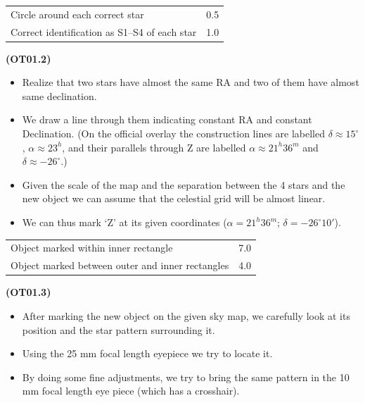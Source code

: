 \begin{center}
\begin{tabular}{l r}
\hline
Circle around each correct star & 0.5 \\
Correct identification as S1--S4 of each star & 1.0 \\
\hline
\end{tabular}
\end{center}

\textbf{(OT01.2)}
\begin{itemize}
\item Realize that two stars have almost the same RA and two of them have
  almost same declination.
\item We draw a line through them indicating constant RA and constant
  Declination. (On the official overlay the construction lines are labelled
  $\delta \approx 15^\circ$, $\alpha \approx 23^h$, and their parallels
  through Z are labelled $\alpha \approx 21^h36^m$ and
  $\delta \approx -26^\circ$.)
\item Given the scale of the map and the separation between the 4 stars and
  the new object we can assume that the celestial grid will be almost
  linear.
\item We can thus mark `Z' at its given coordinates
  ($\alpha = 21^h36^m$; $\delta = -26^\circ10'$).
\end{itemize}

\begin{center}
\begin{tabular}{l r}
\hline
Object marked within inner rectangle & 7.0 \\
\quad Object marked between outer and inner rectangles & 4.0 \\
\hline
\end{tabular}
\end{center}

\textbf{(OT01.3)}
\begin{itemize}
\item After marking the new object on the given sky map, we carefully look
  at its position and the star pattern surrounding it.
\item Using the 25 mm focal length eyepiece we try to locate it.
\item By doing some fine adjustments, we try to bring the same pattern in
  the 10 mm focal length eye piece (which has a crosshair).
\end{itemize}

